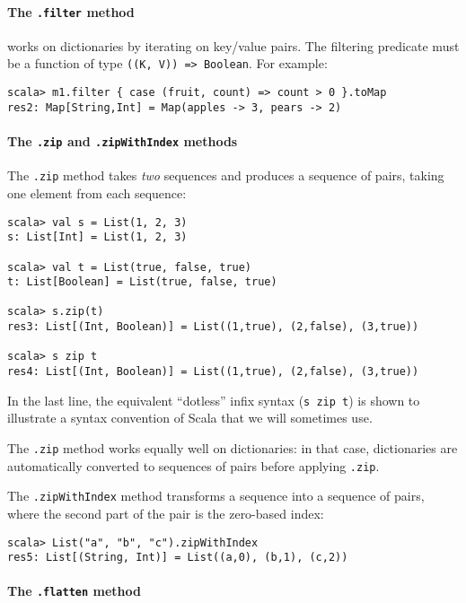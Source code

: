 \paragraph*{The \lstinline!.filter! method }

works on dictionaries by iterating on key/value pairs. The filtering
predicate must be a function of type \lstinline!((K, V)) => Boolean!.
For example:
\begin{lstlisting}
scala> m1.filter { case (fruit, count) => count > 0 }.toMap
res2: Map[String,Int] = Map(apples -> 3, pears -> 2)
\end{lstlisting}


\paragraph*{The \lstinline!.zip! and \lstinline!.zipWithIndex! methods}

The \lstinline!.zip! method takes \emph{two} sequences and produces
a sequence of pairs, taking one element from each sequence:
\begin{lstlisting}
scala> val s = List(1, 2, 3)
s: List[Int] = List(1, 2, 3)

scala> val t = List(true, false, true)
t: List[Boolean] = List(true, false, true)

scala> s.zip(t)
res3: List[(Int, Boolean)] = List((1,true), (2,false), (3,true))

scala> s zip t
res4: List[(Int, Boolean)] = List((1,true), (2,false), (3,true)) 
\end{lstlisting}
In the last line, the equivalent ``dotless'' infix syntax (\lstinline!s zip t!)
is shown to illustrate a syntax convention of Scala that we will sometimes
use.

The \lstinline!.zip! method works equally well on dictionaries: in
that case, dictionaries are automatically converted to sequences of
pairs before applying \lstinline!.zip!.

The \lstinline!.zipWithIndex! method transforms a sequence into a
sequence of pairs, where the second part of the pair is the zero-based
index:
\begin{lstlisting}
scala> List("a", "b", "c").zipWithIndex
res5: List[(String, Int)] = List((a,0), (b,1), (c,2)) 
\end{lstlisting}


\paragraph*{The \lstinline!.flatten! method}

